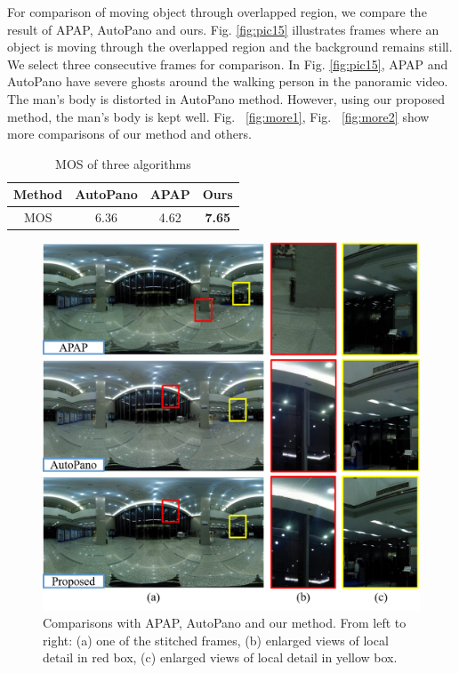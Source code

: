 \documentclass[conference]{IEEEtran}
\begin{document}
For comparison of moving object through overlapped region, we compare the result of APAP, AutoPano and ours. Fig. \ref{fig:pic15} 
illustrates frames where an object is moving through the overlapped region and the background remains still. 
We select three consecutive frames for comparison. In Fig. \ref{fig:pic15}, APAP and AutoPano have severe ghosts around the walking person in the panoramic video. 
The man's body is distorted in AutoPano method. However, using our proposed method, the man's body is kept well. 
Fig. ~\ref{fig:more1}, Fig. ~\ref{fig:more2} show more comparisons of our method and others.
\begin{table}[!htpb]
\caption{MOS of three algorithms}
\label{tab1:table1}
\centering
\begin{tabular}{c|c|c|c}
\hline
Method& AutoPano& APAP& Ours\\
\hline
MOS& 6.36& 4.62& \bf{7.65}\\
\hline
\end{tabular}
\end{table}
\begin{figure}[!htpb]
\centering
\includegraphics[scale=0.415]{picture35.png}
\caption{Comparisons with APAP, AutoPano and our method. From left to right: (a) one of the stitched frames, (b) enlarged views of local
detail in red box, (c) enlarged views of local detail in yellow box.}
\label{fig:pic17}
\end{figure}
\end{document}
